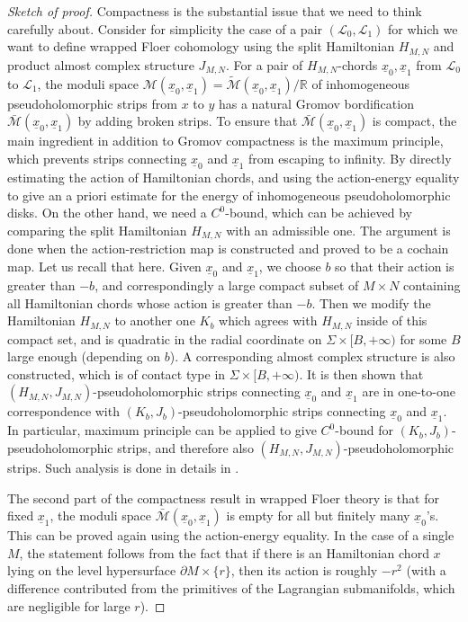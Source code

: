 \documentclass{amsart}
\numberwithin{equation}{section}
\numberwithin{figure}{section}
\begin{document}
\begin{proof}[Sketch of proof]
	Compactness is the substantial issue that we need to think carefully about. Consider for simplicity the case of a pair $(\mathcal{L}_{0}, \mathcal{L}_{1})$ for which we want to define wrapped Floer cohomology using the split Hamiltonian $H_{M, N}$ and product almost complex structure $J_{M, N}$. For a pair of $H_{M, N}$-chords $\underline{x}_{0}, \underline{x}_{1}$ from $\mathcal{L}_{0}$ to $\mathcal{L}_{1}$, the moduli space $\mathcal{M}(\underline{x}_{0}, \underline{x}_{1}) = \tilde{\mathcal{M}}(\underline{x}_{0}, \underline{x}_{1})/\mathbb{R}$ of inhomogeneous pseudoholomorphic strips from $x$ to $y$ has a natural Gromov bordification $\bar{\mathcal{M}}(\underline{x}_{0}, \underline{x}_{1})$ by adding broken strips. To ensure that $\bar{\mathcal{M}}(\underline{x}_{0}, \underline{x}_{1})$ is compact, the main ingredient in addition to Gromov compactness is the maximum principle, which prevents strips connecting $\underline{x}_{0}$ and $\underline{x}_{1}$ from escaping to infinity. By directly estimating the action of Hamiltonian chords, and using the action-energy equality to give an a priori estimate for the energy of inhomogeneous pseudoholomorphic disks. On the other hand, we need a $C^{0}$-bound, which can be achieved by comparing the split Hamiltonian $H_{M, N}$ with an admissible one. The argument is done when the action-restriction map is constructed and proved to be a cochain map. Let us recall that here. Given $\underline{x}_{0}$ and $\underline{x}_{1}$, we choose $b$ so that their action is greater than $-b$, and correspondingly a large compact subset of $M \times N$ containing all Hamiltonian chords whose action is greater than $-b$. Then we modify the Hamiltonian $H_{M, N}$ to another one $K_{b}$ which agrees with $H_{M, N}$ inside of this compact set, and is quadratic in the radial coordinate on $\Sigma \times [B, +\infty)$ for some $B$ large enough (depending on $b$). A corresponding almost complex structure is also constructed, which is of contact type in $\Sigma \times [B, +\infty)$. It is then shown that $(H_{M, N}, J_{M, N})$-pseudoholomorphic strips connecting $\underline{x}_{0}$ and $\underline{x}_{1}$ are in one-to-one correspondence with $(K_{b}, J_{b})$-pseudoholomorphic strips connecting $\underline{x}_{0}$ and $\underline{x}_{1}$. In particular, maximum principle can be applied to give $C^{0}$-bound for $(K_{b}, J_{b})$-pseudoholomorphic strips, and therefore also $(H_{M, N}, J_{M, N})$-pseudoholomorphic strips. Such analysis is done in details in \cite{Gao1}. \par
	The second part of the compactness result in wrapped Floer theory is that for fixed $\underline{x}_{1}$, the moduli space $\bar{\mathcal{M}}(\underline{x}_{0}, \underline{x}_{1})$ is empty for all but finitely many $\underline{x}_{0}$'s. This can be proved again using the action-energy equality. In the case of a single $M$, the statement follows from the fact that if there is an Hamiltonian chord $x$ lying on the level hypersurface $\partial M \times \{r\}$, then its action is roughly $-r^{2}$ (with a difference contributed from the primitives of the Lagrangian submanifolds, which are negligible for large $r$). \par

\end{proof}
\end{document}
